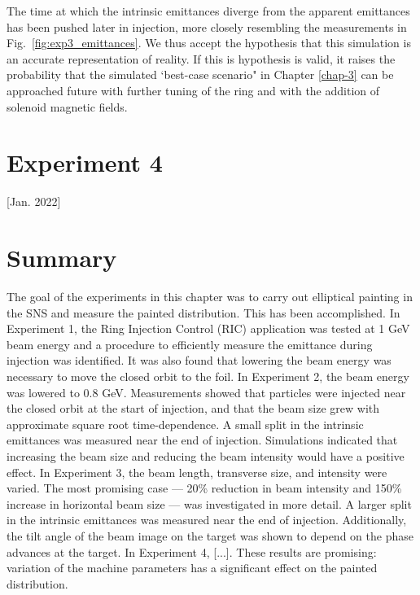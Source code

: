 %
The time at which the intrinsic emittances diverge from the apparent emittances has been pushed later in injection, more closely resembling the measurements in Fig.~\ref{fig:exp3_emittances}. We thus accept the hypothesis that this simulation is an accurate representation of reality. If this is hypothesis is valid, it raises the probability that the simulated `best-case scenario" in Chapter \ref{chap-3} can be approached future with further tuning of the ring and with the addition of solenoid magnetic fields.




\section{Experiment 4}

[Jan. 2022]


\section{Summary}

The goal of the experiments in this chapter was to carry out elliptical painting in the SNS and measure the painted distribution. This has been accomplished. In Experiment 1, the Ring Injection Control (RIC) application was tested at 1 GeV beam energy and a procedure to efficiently measure the emittance during injection was identified. It was also found that lowering the beam energy was necessary to move the closed orbit to the foil. In Experiment 2, the beam energy was lowered to 0.8 GeV. Measurements showed that particles were injected near the closed orbit at the start of injection, and that the beam size grew with approximate square root time-dependence. A small split in the intrinsic emittances was measured near the end of injection. Simulations indicated that increasing the beam size and reducing the beam intensity would have a positive effect. In Experiment 3, the beam length, transverse size, and intensity were varied. The most promising case — 20\% reduction in beam intensity and 150\% increase in horizontal beam size — was investigated in more detail. A larger split in the intrinsic emittances was measured near the end of injection. Additionally, the tilt angle of the beam image on the target was shown to depend on the phase advances at the target. In Experiment 4, [...]. These results are promising: variation of the machine parameters has a significant effect on the painted distribution.